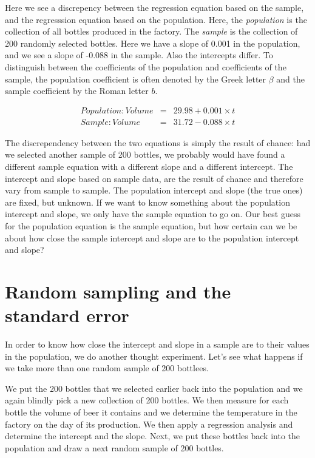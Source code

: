 \documentclass[]{report}\usepackage[]{graphicx}\usepackage[]{color}
\begin{document}
Here we see a discrepency between the regression equation based on the sample, and the regresssion equation based on the population. Here, the \textit{population} is the collection of all bottles produced in the factory. The \textit{sample} is the collection of 200 randomly selected bottles. Here we have a slope of 0.001 in the population, and we see a slope of -0.088 in the sample. Also the intercepts differ. To distinguish between the coefficients of the population and coefficients of the sample, the population coefficient is often denoted by the Greek letter $\beta$ and the sample coefficient by the Roman letter $b$.



\begin{eqnarray}
Population: Volume &=& 29.98 + 0.001 \times t  \nonumber\\
Sample: Volume &=&  31.72  -0.088 \times t \nonumber
\end{eqnarray}

The discrependency between the two equations is simply the result of chance: had we selected another sample of 200 bottles, we probably would have found a different sample equation with a different slope and a different intercept. The intercept and slope based on sample data, are the result of chance and therefore vary from sample to sample. The population intercept and slope (the true ones) are fixed, but unknown. If we want to know something about the population intercept and slope, we only have the sample equation to go on. Our best guess for the population equation is the sample equation, but how certain can we be about how close the sample intercept and slope are to the population intercept and slope?


\section{Random sampling and the standard error}


In order to know how close the intercept and slope in a sample are to their values in the population, we do another thought experiment. Let's see what happens if we take more than one random sample of 200 bottlees. 

We put the 200 bottles that we selected earlier back into the population and we again blindly pick a new collection of 200 bottles. We then measure for each bottle the volume of beer it contains and we determine the temperature in the factory on the day of its production. We then apply a regression analysis and determine the intercept and the slope. Next, we put these bottles back into the population and draw a next random sample of 200 bottles.
\end{document}
